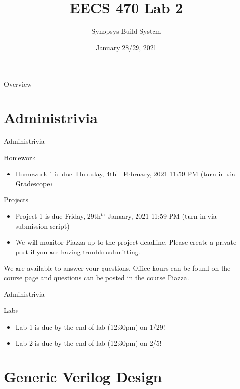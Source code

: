 \documentclass[dvipsnames]{beamer}
\title[Lab 2: Build System]{EECS 470 Lab 2}
\subtitle{Synopsys Build System}
\institute[University of Michigan]{Department of Electrical Engineering and 
			Computer Science \\
			College of Engineering \\
			University of Michigan}
\date{January 28/29, 2021}
\begin{document}
\frame{\titlepage}

\begin{frame}{Overview}
	\tableofcontents
\end{frame}

\section{Administrivia}
\begin{frame}{Administrivia}

\begin{block}{Homework}
		\begin{itemize}
			\item Homework 1 is due Thursday, 4th$^{\text{th}}$ February, 2021 11:59 PM (turn in via Gradescope)
		\end{itemize}
\end{block}
\begin{block}{Projects}
	\begin{itemize}
        \item Project 1 is due Friday, 29th$^{\text{th}}$ January, 2021 11:59 PM (turn in via submission script)
		\item We will monitor Piazza up to the project deadline. Please create a private post if you are having trouble submitting.
	\end{itemize}
\end{block}
	\begin{block}{}
		We are available to answer your questions. Office hours can
		be found on the course page and questions can be posted in the course
		Piazza.
	\end{block}
\end{frame}

\begin{frame}{Administrivia}

\begin{block}{Labs}
		\begin{itemize}
			\item Lab 1 is due by the end of lab (12:30pm) on 1/29!
			\item Lab 2 is due by the end of lab (12:30pm) on 2/5!
		\end{itemize}
\end{block}
\end{frame}

\section{Generic Verilog Design}
\end{document}
